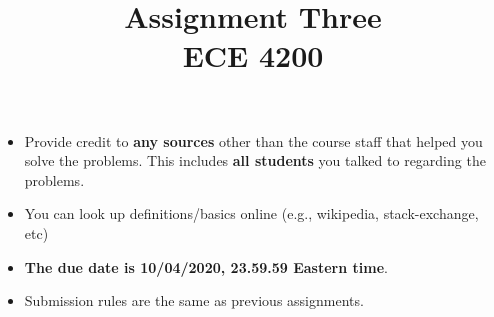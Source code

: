 \documentclass[11pt]{article}
\title{Assignment Three\\ ECE 4200}
\date{}
\begin{document}
\maketitle 

\begin{itemize}
\item
Provide credit to \textbf{any sources} other than the course staff that helped you solve the problems. This includes \textbf{all students} you talked to regarding the problems. 	
\item
You can look up definitions/basics online (e.g., wikipedia, stack-exchange, etc)
\item
{\bf The due date is 10/04/2020, 23.59.59 Eastern time}. 
\item
Submission rules are the same as previous assignments.
\end{itemize}
\end{document}
